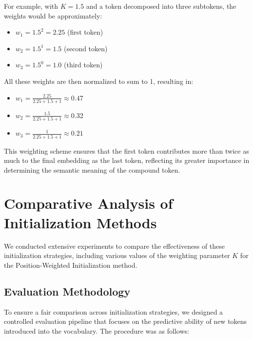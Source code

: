 For example, with $K = 1.5$ and a token decomposed into three subtokens, the weights would be approximately:
\begin{itemize}
    \item $w_1 = 1.5^2 = 2.25$ (first token)
    \item $w_2 = 1.5^1 = 1.5$ (second token)
    \item $w_3 = 1.5^0 = 1.0$ (third token)
\end{itemize}

All these weights are then normalized to sum to 1, resulting in:
\begin{itemize}
    \item $w_1 = \frac{2.25}{2.25+1.5+1} \approx 0.47$
    \item $w_2 = \frac{1.5}{2.25+1.5+1}  \approx 0.32$
    \item $w_3 = \frac{1}{2.25+1.5+1}    \approx 0.21$
\end{itemize}

This weighting scheme ensures that the first token contributes more than twice as much to the final embedding as the last token, reflecting its greater importance in determining the semantic meaning of the compound token.

\section{Comparative Analysis of Initialization Methods}

We conducted extensive experiments to compare the effectiveness of these initialization strategies, including various values of the weighting parameter $K$ for the Position-Weighted Initialization method.

\subsection{Evaluation Methodology}
\label{subsec:evaluation_methodology}

To ensure a fair comparison across initialization strategies, we designed a controlled evaluation pipeline that focuses on the predictive ability of new tokens introduced into the vocabulary. The procedure was as follows:

